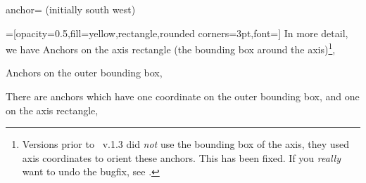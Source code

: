 \begin{pgfplotskey}{anchor= (initially south west)}
{%
\plottable
\def\plot{%
	\begin{axis}[
		width=5cm,
		name=test plot,
		xlabel=$x$,
		ylabel={$y$},%
		legend style={at={(1.03,1)},anchor=north west},
		title=A test plot.
	]
		\addplot table from{\plottable};
		\addlegendentry{$f(x)$}
		\addplot[red] plot[id=gnuplot_ppp,domain=-40:40,samples=120] gnuplot{10000*sin(x/3)};
		\addlegendentry{$g(x)$}
	\end{axis}
}%
\def\showit#1#2{%
	\node[pin=#2:(s.#1),fill=black,circle,scale=0.3] at (test plot.#1) {};
}%
=[opacity=0.5,fill=yellow,rectangle,rounded corners=3pt,font=\tiny]%
In more detail, we have
Anchors on the axis rectangle (the bounding box around the axis)\footnote{Versions prior to \PGFPlots\ v.1.3 did \emph{not} use the bounding box of the axis, they used axis coordinates to orient these anchors. This has been fixed. If you \emph{really} want to undo the bugfix, see \texttt{\protect{}}.},
		\begin{center}
		\end{center}
Anchors on the outer bounding box,
		\begin{center}
		\end{center}
There are anchors which have one coordinate on the outer bounding box, and one on the axis rectangle,
		\begin{center}
\end{center}}
\end{pgfplotskey}
